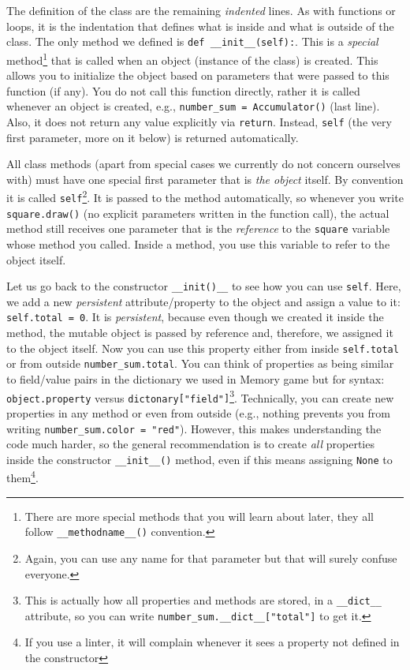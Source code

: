 \documentclass[
]{book}
\begin{document}
The definition of the class are the remaining \emph{indented} lines. As with functions or loops, it is the indentation that defines what is inside and what is outside of the class. The only method we defined is \texttt{def\ \_\_init\_\_(self):}. This is a \emph{special} method\footnote{There are more special methods that you will learn about later, they all follow \texttt{\_\_methodname\_\_()} convention.} that is called when an object (instance of the class) is created. This allows you to initialize the object based on parameters that were passed to this function (if any). You do not call this function directly, rather it is called whenever an object is created, e.g., \texttt{number\_sum\ =\ Accumulator()} (last line). Also, it does not return any value explicitly via \texttt{return}. Instead, \texttt{self} (the very first parameter, more on it below) is returned automatically.

All class methods (apart from special cases we currently do not concern ourselves with) must have one special first parameter that is \emph{the object} itself. By convention it is called \texttt{self}\footnote{Again, you can use any name for that parameter but that will surely confuse everyone.}. It is passed to the method automatically, so whenever you write \texttt{square.draw()} (no explicit parameters written in the function call), the actual method still receives one parameter that is the \emph{reference} to the \texttt{square} variable whose method you called. Inside a method, you use this variable to refer to the object itself.

Let us go back to the constructor \texttt{\_\_init()\_\_} to see how you can use \texttt{self}. Here, we add a new \emph{persistent} attribute/property to the object and assign a value to it: \texttt{self.total\ =\ 0}. It is \emph{persistent}, because even though we created it inside the method, the mutable object is passed by reference and, therefore, we assigned it to the object itself. Now you can use this property either from inside \texttt{self.total} or from outside \texttt{number\_sum.total}. You can think of properties as being similar to field/value pairs in the dictionary we used in Memory game but for syntax: \texttt{object.property} versus \texttt{dictonary{[}"field"{]}}\footnote{This is actually how all properties and methods are stored, in a \texttt{\_\_dict\_\_} attribute, so you can write \texttt{number\_sum.\_\_dict\_\_{[}"total"{]}} to get it.}. Technically, you can create new properties in any method or even from outside (e.g., nothing prevents you from writing \texttt{number\_sum.color\ =\ "red"}). However, this makes understanding the code much harder, so the general recommendation is to create \emph{all} properties inside the constructor \texttt{\_\_init\_\_()} method, even if this means assigning \texttt{None} to them\footnote{If you use a linter, it will complain whenever it sees a property not defined in the constructor}.
\end{document}
